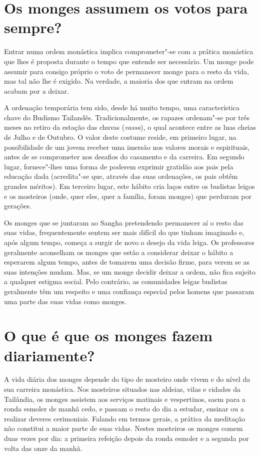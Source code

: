 \section{Os monges assumem os votos para sempre?}

Entrar numa ordem monástica implica comprometer"-se com a prática
monástica que lhes é proposta durante o tempo que entende ser necessário.
Um monge pode assumir para consigo próprio o voto de permanecer monge
para o resto da vida, mas tal não lhe é exigido. Na verdade, a maioria
dos que entram na ordem acabam por a deixar.

A ordenação temporária tem sido, desde há muito tempo, uma
característica chave do Budismo Tailandês. Tradicionalmente, os rapazes
ordenam"-se por três meses no retiro da estação das chuvas
(\emph{vassa}), o qual acontece entre as luas cheias de Julho e de
Outubro. O valor deste costume reside, em primeiro lugar, na
possibilidade de um jovem receber uma imersão nos valores morais e
espirituais, antes de se comprometer nos desafios do casamento e da
carreira. Em segundo lugar, fornece"-lhes uma forma de poderem exprimir
gratidão aos pais pela educação dada (acredita"-se que, através das suas
ordenações, os pais obtêm grandes méritos). Em terceiro lugar, este
hábito cria laços entre os budistas leigos e os mosteiros (onde, quer
eles, quer a família, foram monges) que perduram por gerações.

Os monges que se juntaram ao Sangha pretendendo permanecer aí o resto
das suas vidas, frequentemente sentem ser mais difícil do que tinham
imaginado e, após algum tempo, começa a surgir de novo o desejo da vida
leiga. Os professores geralmente aconselham os monges que estão a
considerar deixar o hábito a esperarem algum tempo, antes de tomarem uma
decisão firme, para verem se as suas intenções mudam. Mas, se um monge
decidir deixar a ordem, não fica sujeito a qualquer estigma social. Pelo
contrário, as comunidades leigas budistas geralmente têm um respeito e
uma confiança especial pelos homens que passaram uma parte das suas
vidas como monges.

\section{O que é que os monges fazem diariamente?}

A vida diária dos monges depende do tipo de mosteiro onde vivem e do
nível da sua carreira monástica. Nos mosteiros situados nas aldeias,
vilas e cidades da Tailândia, os monges assistem aos serviços matinais e
vespertinos, saem para a ronda esmoler de manhã cedo, e passam o resto
do dia a estudar, ensinar ou a realizar deveres cerimoniais. Falando em
termos gerais, a prática da meditação não constitui a maior parte de
suas vidas. Nestes mosteiros os monges comem duas vezes por dia: a
primeira refeição depois da ronda esmoler e a segunda por volta das
onze da manhã.

